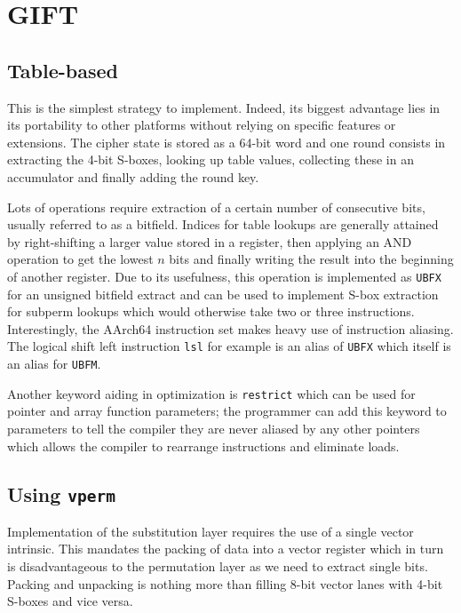 \section{GIFT}
\subsection{Table-based}

This is the simplest strategy to implement. Indeed, its biggest advantage lies
in its portability to other platforms without relying on specific features or
extensions. The cipher state is stored as a 64-bit word and one round consists
in extracting the 4-bit S-boxes, looking up table values, collecting these in
an accumulator and finally adding the round key.




Lots of operations require extraction of a certain number of consecutive bits,
usually referred to as a bitfield. Indices for table lookups are generally
attained by right-shifting a larger value stored in a register, then applying
an AND operation to get the lowest $n$ bits and finally writing the result into
the beginning of another register. Due to its usefulness, this operation is
implemented as \texttt{UBFX} for an unsigned bitfield extract and can be used
to implement S-box extraction for subperm lookups which would otherwise take
two or three instructions. Interestingly, the AArch64 instruction set makes
heavy use of instruction aliasing. The logical shift left instruction
\texttt{lsl} for example is an alias of \texttt{UBFX} which itself is an alias
for \texttt{UBFM}.

Another keyword aiding in optimization is \texttt{restrict} which can be used
for pointer and array function parameters; the programmer can add this keyword
to parameters to tell the compiler they are never aliased by any other pointers
which allows the compiler to rearrange instructions and eliminate loads.

\subsection{Using \texttt{vperm}}

Implementation of the substitution layer requires the use of a single vector
intrinsic. This mandates the packing of data into a vector register which in
turn is disadvantageous to the permutation layer as we need to extract single
bits. Packing and unpacking is nothing more than filling 8-bit vector lanes
with 4-bit S-boxes and vice versa.

